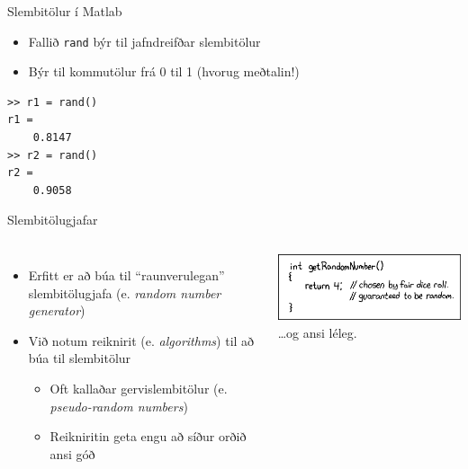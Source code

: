 \documentclass[handout]{beamer}
\begin{document}
\begin{frame}[fragile]{Slembitölur í Matlab}
\begin{itemize}
 \item Fallið \texttt{rand} býr til jafndreifðar slembitölur
 \item Býr til kommutölur frá 0 til 1 (hvorug meðtalin!)
\end{itemize}
\begin{verbatim}
>> r1 = rand()
r1 =
    0.8147
>> r2 = rand()
r2 =
    0.9058
\end{verbatim}
\end{frame}

\begin{frame}{Slembitölugjafar}
\begin{columns}
\begin{itemize}
 \item Erfitt er að búa til ``raunverulegan'' slembitölugjafa (e. \emph{random number generator})
 \item Við notum reiknirit (e. \emph{algorithms}) til að búa til slembitölur
 \begin{itemize}
  \item Oft kallaðar gervislembitölur (e. \emph{pseudo-random numbers})
  \item Reikniritin geta engu að síður orðið ansi góð \pause
 \end{itemize}
\end{itemize}
\begin{center}
\includegraphics[width=\linewidth]{Pics/xkcd-random} \\
\ldots og ansi léleg.
\end{center}
\end{columns}
\end{frame}
\end{document}
